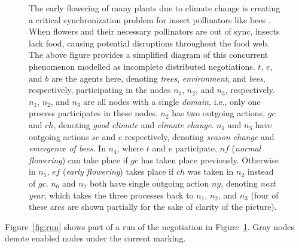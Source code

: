\begin{figure}[t]
\begin{tikzpicture}[scale=1, every node/.style={transform shape}]
\end{tikzpicture}
\caption{The early flowering of many plants due to climate change is creating a critical synchronization problem for insect pollinators like bees \cite{}. When flowers and their necessary pollinators are out of sync, insects lack food, causing potential disruptions throughout the food web. The above figure provides a simplified diagram of this concurrent phenomenon modelled as incomplete distributed negotiations. $t$, $e$, and $b$ are the agents here, denoting \textit{trees}, \textit{environment}, and \textit{bees}, respectively, participating in the nodes $n_1$, $n_2$, and $n_3$, respectively. $n_1$, $n_2$, and $n_3$ are all nodes with a single \textit{domain}, i.e., only one process participates in these nodes. $n_2$ has two outgoing actions, $gc$ and $ch$, denoting \textit{good climate} and \textit{climate change}. $n_1$ and $n_3$ have outgoing actions $sc$ and $e$ respectively, denoting \textit{season change} and \textit{emergence of bees}. In $n_4$, where $t$ and $e$ participate, $nf$ (\textit{normal flowering}) can take place if $gc$ has taken place previously. Otherwise in $n_5$, $ef$ (\textit{early flowering}) takes place if $ch$ was taken in $n_2$ instead of $gc$. $n_6$ and $n_7$ both have single outgoing action $ny$, denoting \textit{next year}, which takes the three processes back to $n_1$, $n_2$, and $n_3$ (four of these arcs are shown partially for the sake of clarity of the picture).}
\label{fig:pollination}
\end{figure}

Figure~\ref{fig:run} shows part of a run of the negotiation in Figure~\ref{fig:pollination}. Gray nodes denote enabled nodes under the current marking.

